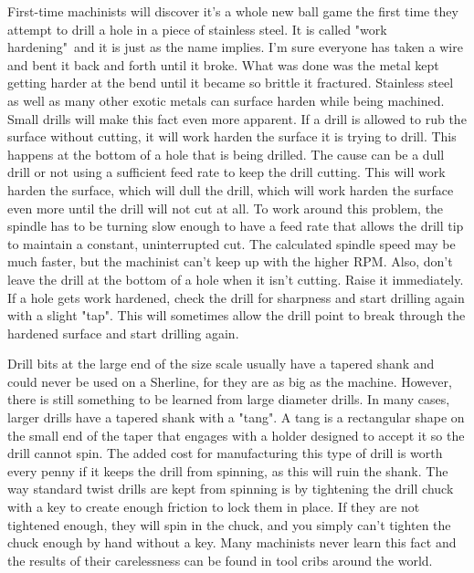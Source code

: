 First-time machinists will discover it's a whole new ball game the first time
they attempt to drill a hole in a piece of stainless steel. It is called "work
hardening"\ and it is just as the name implies. I'm sure everyone has taken a
wire and bent it back and forth until it broke. What was done was the metal kept
getting harder at the bend until it became so brittle it fractured. Stainless
steel as well as many other exotic metals can surface harden while being
machined. Small drills will make this fact even more apparent. If a drill is
allowed to rub the surface without cutting, it will work harden the surface it
is trying to drill. This happens at the bottom of a hole that is being drilled.
The cause can be a dull drill or not using a sufficient feed rate to keep the
drill cutting. This will work harden the surface, which will dull the drill,
which will work harden the surface even more until the drill will not cut at
all. To work around this problem, the spindle has to be turning slow enough to
have a feed rate that allows the drill tip to maintain a constant, uninterrupted
cut. The calculated spindle speed may be much faster, but the machinist can't
keep up with the higher RPM. Also, don't leave the drill at the bottom of a hole
when it isn't cutting. Raise it immediately. If a hole gets work hardened, check
the drill for sharpness and start drilling again with a slight "tap". This will
sometimes allow the drill point to break through the hardened surface and start
drilling again.


Drill bits at the large end of the size scale usually have a tapered shank and
could never be used on a Sherline, for they are as big as the machine. However,
there is still something to be learned from large diameter drills. In many
cases, larger drills have a tapered shank with a "tang". A tang is a rectangular
shape on the small end of the taper that engages with a holder designed to
accept it so the drill cannot spin. The added cost for manufacturing this type
of drill is worth every penny if it keeps the drill from spinning, as this will
ruin the shank. The way standard twist drills are kept from spinning is by
tightening the drill chuck with a key to create enough friction to lock them in
place. If they are not tightened enough, they will spin in the chuck, and you
simply can't tighten the chuck enough by hand without a key. Many machinists
never learn this fact and the results of their carelessness can be found in tool
cribs around the world.

